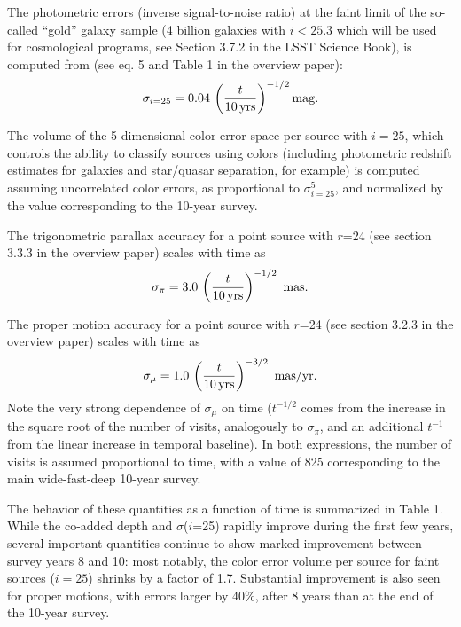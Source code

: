 \documentclass[DM,lsstdraft,toc,usenatbib]{lsstdoc}
\begin{document}
The photometric errors (inverse signal-to-noise ratio) at the faint limit of the so-called 
``gold'' galaxy sample (4 billion galaxies with $i<25.3$ which will be used for cosmological
programs, see Section 3.7.2 in the LSST Science Book), is computed from (see eq. 5 and Table 1 
in the overview paper):
\begin{equation} 
                \sigma_{i=25} = 0.04 \, \left({t \over 10 \, {\rm yrs}}\right)^{-1/2} {\rm mag.}
\end{equation}

The volume of the 5-dimensional color error space per source with $i=25$,  which controls the ability 
to classify sources using colors (including photometric redshift estimates for galaxies and star/quasar
separation, for example) is computed assuming uncorrelated color errors, as proportional
to $\sigma^5_{i=25}$, and normalized by the value corresponding to the 10-year survey. 

The trigonometric parallax accuracy for a point source with $r$=24 (see section 3.3.3 in the 
overview paper) scales with time as 
\begin{equation}
        \sigma_\pi = 3.0 \,  \left({t \over 10 \, {\rm yrs}}\right)^{-1/2}  \,\,  {\rm mas.} 
\end{equation}

The proper motion accuracy for a point source with $r$=24 (see section 3.2.3 in the overview paper)
scales with time as 
\begin{equation}
        \sigma_\mu = 1.0 \,  \left({t \over 10 \, {\rm yrs}}\right)^{-3/2}   \,\, {\rm mas/yr.} 
\end{equation}
Note the very strong dependence of  $\sigma_\mu$ on time ($t^{-1/2}$ comes from the
increase in the square root of the number of visits, analogously to $\sigma_\pi$, and 
an additional $t^{-1}$ from the linear increase in temporal baseline).  In both expressions,
the number of visits is assumed proportional to time, with a value of 825 corresponding to the 
main wide-fast-deep 10-year survey. 

The behavior of these quantities as a function of time is summarized in Table 1. While 
the co-added depth and $\sigma$($i$=25) rapidly improve during the first few years, 
several important quantities continue to show marked improvement between survey 
years 8 and 10: most notably, the color error volume per source for faint sources ($i=25$) 
shrinks by a factor of 1.7.  Substantial improvement is also seen for proper motions, 
with errors larger by 40\%, after 8 years than at the end of the 10-year survey.  
\end{document}
